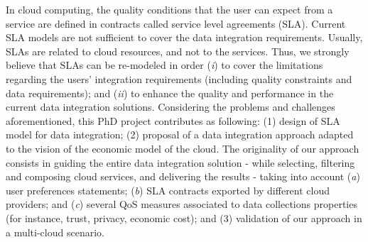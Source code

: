In cloud computing, the quality conditions that the user can expect from a service are defined in contracts called service level agreements (SLA). Current SLA models are not sufficient to cover the data integration requirements. Usually, SLAs are related to cloud resources, and not to the services. Thus, we strongly believe that SLAs can be re-modeled in order (\textit{i}) to cover the limitations regarding the users' integration requirements (including quality constraints and data requirements); and (\textit{ii}) to enhance the quality and performance in the current data integration solutions. 
Considering the problems and challenges aforementioned, this PhD project contributes as following: (1) design of SLA model for data integration; (2) proposal of a data integration approach adapted to the vision of the economic model of the cloud. The originality of our approach consists in guiding the entire data integration solution - while selecting, filtering and composing cloud services, and delivering the results - taking into account (\textit{a}) user preferences statements; (\textit{b}) SLA contracts exported by different cloud providers; and (\textit{c}) several QoS measures associated to data collections properties (for instance, trust, privacy, economic cost); and (3) validation of our approach in a multi-cloud scenario.
